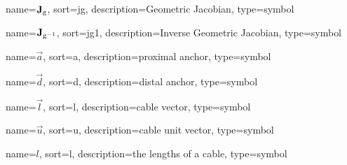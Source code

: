 	{%
		name=\ensuremath{\mat{J}_{\func{g}}},
		sort=jg,
		description=Geometric Jacobian,
		type=symbol
	}
	\newcommand{\geometricjac}{\gls{sym:geometricjac}}

	{%
		name=\ensuremath{\mat{J}_{\func{g}^{-1}}},
		sort=jg1,
		description=Inverse Geometric Jacobian,
		type=symbol
	}
	\newcommand{\invgeometricjac}{\gls{sym:invgeometricjac}}

	{%
		name=\ensuremath{\vec{a}},
		sort=a,
		description=proximal anchor,
		type=symbol
	}
	\newcommand{\proximalanchor}{\gls{sym:proximalanchor}}

	{%
		name=\ensuremath{\vec{d}},
		sort=d,
		description=distal anchor,
		type=symbol
	}
	\newcommand{\distalanchor}{\gls{sym:distalanchor}}

	{%
		name=\ensuremath{\vec{l}},
		sort=l,
		description=cable vector,
		type=symbol
	}
	\newcommand{\cablevec}{\gls{sym:cablevec}}

	{%
		name=\ensuremath{\vec{u}},
		sort=u,
		description=cable unit vector,
		type=symbol
	}
	\newcommand{\cableuvec}{\gls{sym:cableuvec}}

	{%
		name=\ensuremath{l},
		sort=l,
		description=the lengths of a cable,
		type=symbol
	}
	\newcommand{\cablelength}{\gls{sym:cablelength}}

